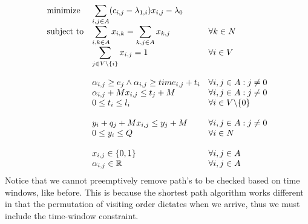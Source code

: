 \documentclass{article}
\begin{document}
    \begin{equation*}
        \begin{array}{ll@{}ll}
            \text{minimize}  & \displaystyle\sum_{i,j \in A} ( c_{i, j} - \lambda_{1,i})x_{i,j} - \lambda_0&&\\
            \text{subject to}& \displaystyle\sum_{i, k \in A}x_{i,k} = \sum_{k, j \in A}x_{k,j} &&\forall k \in N\\
            & \displaystyle\sum_{j \in V \backslash \{ i \}}x_{i,j} = 1 && \forall i \in V\\\\
            & \displaystyle\alpha_{i,j} \geq e_j \land \alpha_{i,j} \geq time_{i,j} + t_i &&  \forall i,j \in A: j \neq 0\\
            & \displaystyle \alpha_{i,j} + Mx_{i,j} \leq t_j + M  && \forall i,j \in A: j \neq 0\\
            & \displaystyle0 \leq t_i \leq l_i &&  \forall i \in V \backslash \{ 0 \}\\\\
            & \displaystyle y_i + q_j + M x_{i,j} \leq y_j + M & & \forall i,j \in A : j \neq 0\\
            & \displaystyle 0 \leq y_i \leq Q && \forall i \in N \\\\
            & \displaystyle x_{i,j} \in \{0,1\} && \forall i,j \in A\\
            & \displaystyle \alpha_{i,j} \in \mathbb{R} && \forall i,j \in A
        \end{array}
    \end{equation*}
    Notice that we cannot preemptively remove path's to be checked based on time windows, like before.
    This is because the shortest path algorithm works different in that the permutation of visiting order dictates when we arrive, thus we must include the time-window constraint.
\end{document}
